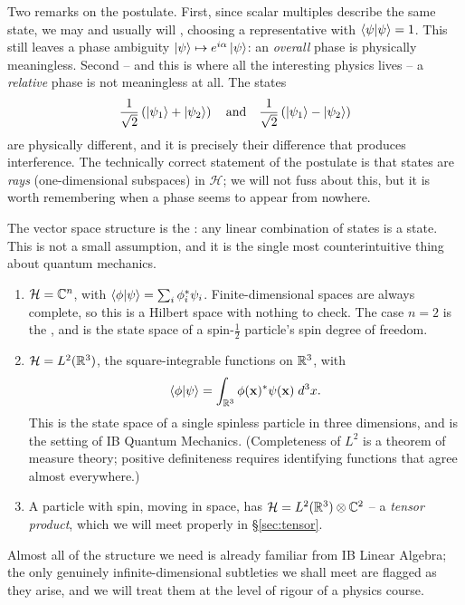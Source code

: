 \documentclass[a4paper]{scrartcl}
\newcommand{\half}{\tfrac{1}{2}}
\begin{document}
Two remarks on the postulate. First, since scalar multiples describe the same state, we may and usually will , choosing a representative with $\braket{\psi}{\psi} = 1$. This still leaves a phase ambiguity $\ket{\psi} \mapsto e^{i\alpha}\ket{\psi}$: an \emph{overall} phase is physically meaningless. Second -- and this is where all the interesting physics lives -- a \emph{relative} phase is not meaningless at all. The states
$$
\frac{1}{\sqrt2}\left( \ket{\psi_1} + \ket{\psi_2} \right) \quad \text{and} \quad \frac{1}{\sqrt{2}}\left( \ket{\psi_1} - \ket{\psi_2} \right)
$$
are physically different, and it is precisely their difference that produces interference. The technically correct statement of the postulate is that states are \emph{rays} (one-dimensional subspaces) in $\mathcal{H}$; we will not fuss about this, but it is worth remembering when a phase seems to appear from nowhere.

The vector space structure is the : any linear combination of states is a state. This is not a small assumption, and it is the single most counterintuitive thing about quantum mechanics.

\begin{example}
    \begin{enumerate}[label=(\roman*)]
        \item $\mathcal{H} = \mathbb{C}^n$, with $\braket{\phi}{\psi} = \sum_i \phi_i^* \psi_i$. Finite-dimensional spaces are always complete, so this is a Hilbert space with nothing to check. The case $n=2$ is the , and is the state space of a spin-$\half$ particle's spin degree of freedom.
        \item $\mathcal{H} = L^2(\mathbb{R}^3)$, the square-integrable functions on $\mathbb{R}^3$, with
        $$
        \braket{\phi}{\psi} = \int_{\mathbb{R}^3} \phi(\mathbf{x})^* \psi(\mathbf{x}) \; d^3 x.
        $$
        This is the state space of a single spinless particle in three dimensions, and is the setting of IB Quantum Mechanics. (Completeness of $L^2$ is a theorem of measure theory; positive definiteness requires identifying functions that agree almost everywhere.)
        \item A particle with spin, moving in space, has $\mathcal{H} = L^2(\mathbb{R}^3) \otimes \mathbb{C}^2$ -- a \emph{tensor product}, which we will meet properly in \S\ref{sec:tensor}.
    \end{enumerate}
\end{example}

Almost all of the structure we need is already familiar from IB Linear Algebra; the only genuinely infinite-dimensional subtleties we shall meet are flagged as they arise, and we will treat them at the level of rigour of a physics course.
\end{document}
